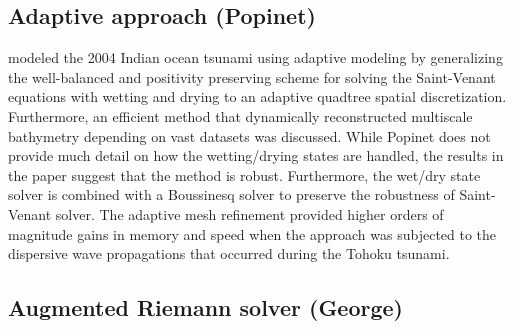 \documentclass[10pt,a4paper]{article}
\newcommand{\ignore}[1]{}
\begin{document}
	\subsection{Adaptive approach (Popinet)}
\citet{popinet2011quadtree} modeled the 2004 Indian ocean tsunami using adaptive modeling by generalizing the \citet{audusse2004fast} well-balanced and positivity preserving scheme for solving the Saint-Venant equations with wetting and drying to an adaptive quadtree spatial discretization.  Furthermore, an efficient method that dynamically reconstructed multiscale bathymetry depending on vast datasets was discussed.  While Popinet does not provide much detail on how the wetting/drying states are handled, the results in the paper suggest that the method is robust.  Furthermore, the wet/dry state solver is combined with a Boussinesq solver to preserve the robustness of Saint-Venant solver. The adaptive mesh refinement provided higher orders of magnitude gains in memory and speed when the approach was subjected to the dispersive wave propagations that occurred during the Tohoku tsunami.

\ignore{
On successfully combining the methods, the exponent power-law describing the computational cost as the function of spatial resolution was significantly reduced by adaptivity. The new exponent is directly associated with the fractal size of the geometric systems that symbolize the propagation of the tsunami. However, Serre-Green-Naghdi equations, also known as the fully-nonlinear Boussinesq wave equations presented in \citet{popinet2015quadtree} proved to preserve the robustness of Saint-Venant solver and generalized automatically to adaptive quadtree meshes.  In addition, the adaptive mesh refinement provided higher orders of magnitude gains in memory and speed when the approach was subjected to the dispersive wave propagations that occurred during the Tohoku tsunami.}


	\subsection{Augmented Riemann solver (George)}
\end{document}
